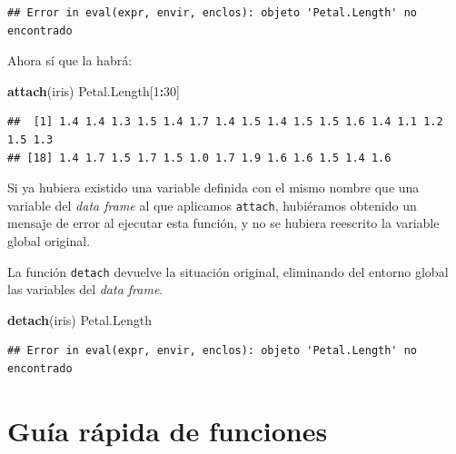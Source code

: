 \documentclass[]{book}
\newenvironment{Shaded}{\begin{snugshade}}{\end{snugshade}}
\newcommand{\DecValTok}[1]{\textcolor[rgb]{0.00,0.00,0.81}{#1}}
\newcommand{\KeywordTok}[1]{\textcolor[rgb]{0.13,0.29,0.53}{\textbf{#1}}}
\newcommand{\NormalTok}[1]{#1}
\newcommand{\OperatorTok}[1]{\textcolor[rgb]{0.81,0.36,0.00}{\textbf{#1}}}
\theoremstyle{definition}
\theoremstyle{definition}
\theoremstyle{definition}
\theoremstyle{remark}
\begin{document}
\begin{verbatim}
## Error in eval(expr, envir, enclos): objeto 'Petal.Length' no encontrado
\end{verbatim}

Ahora sí que la habrá:

\begin{Shaded}
\begin{Highlighting}[]
\KeywordTok{attach}\NormalTok{(iris)}
\NormalTok{Petal.Length[}\DecValTok{1}\OperatorTok{:}\DecValTok{30}\NormalTok{]}
\end{Highlighting}
\end{Shaded}

\begin{verbatim}
##  [1] 1.4 1.4 1.3 1.5 1.4 1.7 1.4 1.5 1.4 1.5 1.5 1.6 1.4 1.1 1.2 1.5 1.3
## [18] 1.4 1.7 1.5 1.7 1.5 1.0 1.7 1.9 1.6 1.6 1.5 1.4 1.6
\end{verbatim}

Si ya hubiera existido una variable definida con el mismo nombre que una variable del \emph{data frame} al que aplicamos \texttt{attach}, hubiéramos obtenido un mensaje de error al ejecutar esta función, y no se hubiera reescrito la variable global original.

La función \texttt{detach} devuelve la situación original, eliminando del entorno global las variables del \emph{data frame}.

\begin{Shaded}
\begin{Highlighting}[]
\KeywordTok{detach}\NormalTok{(iris)}
\NormalTok{Petal.Length}
\end{Highlighting}
\end{Shaded}

\begin{verbatim}
## Error in eval(expr, envir, enclos): objeto 'Petal.Length' no encontrado
\end{verbatim}

\hypertarget{guia-rapida-de-funciones-2}{%
\section{Guía rápida de funciones}\label{guia-rapida-de-funciones-2}}
\end{document}
